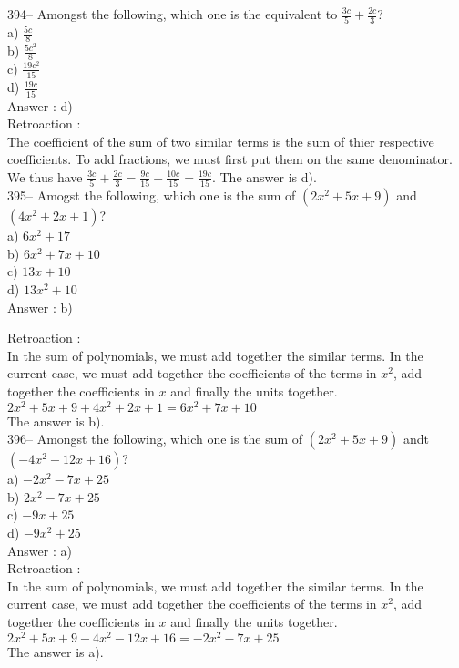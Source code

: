 ﻿\documentclass[letterpaper, 12pt]{article}
\begin{document}
394-- Amongst the following, which one is the equivalent to
$\frac{3c}{5}+\frac{2c}{3}$?\\
a) $\frac{5c}{8}$\\[2mm]
b) $\frac{5c^{2}}{8}$\\[2mm]
c) $\frac{19c^{2}}{15}$\\[2mm]
d) $\frac{19c}{15}$\\

Answer : d)\\

Retroaction : \\
The coefficient of the sum of two similar terms is the sum of thier respective coefficients. To add fractions, we must first put them on the same denominator. \\[2mm]
We thus have
$\frac{3c}{5}+\frac{2c}{3}=\frac{9c}{15}+\frac{10c}{15}=\frac{19c}{15}$. The answer is d).\\

395-- Amogst the following, which one is the sum of
$(2x^{2}+5x+9)$ and $(4x^{2}+2x+1)$?\\
a) $6x^{2}+17$\\
b) $6x^{2}+7x+10$\\
c) $13x+10$\\
d) $13x^{2}+10$\\

Answer : b)

Retroaction : \\
In the sum of polynomials, we must add together the similar terms. In the current case, we must add together the coefficients of the terms in $x^{2}$, add together the coefficients in $x$ and finally the units together.\\
$2x^{2}+5x+9 + 4x^{2}+2x+1 = 6x^{2}+7x+10$\\
The answer is b).\\

396-- Amongst the following, which one is the sum of
$(2x^{2}+5x+9)$ andt $(-4x^{2}-12x+16)$?\\
a) $-2x^{2}-7x+25$\\
b) $2x^{2}-7x+25$\\
c) $-9x+25$\\
d) $-9x^{2}+25$\\

Answer : a)\\

Retroaction : \\
In the sum of polynomials, we must add together the similar terms. In the current case, we must add together the coefficients of the terms in $x^{2}$, add together the coefficients in $x$ and finally the units together.\\
$2x^{2}+5x+9 -4x^{2}-12x+16 = -2x^{2}-7x+25$\\
The answer is a).\\
\end{document}
